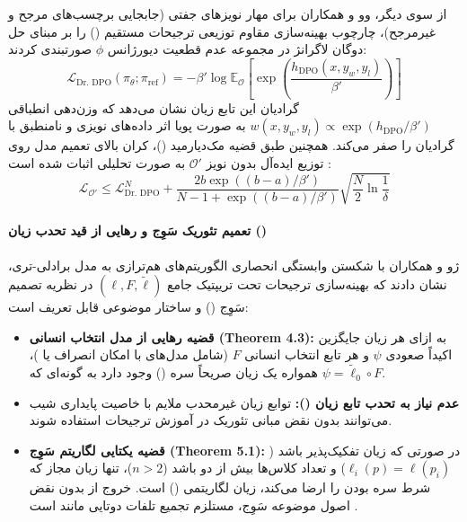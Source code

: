 از سوی دیگر، وو و همکاران \cite{wu2025drdpo} برای مهار نویزهای جفتی (جابجایی برچسب‌های مرجح و غیرمرجح)، چارچوب بهینه‌سازی مقاوم توزیعی ترجیحات مستقیم () را بر مبنای حل دوگان لاگرانژ در مجموعه عدم قطعیت دیورژانس $\phi$ صورتبندی کردند:
\begin{equation}
    \mathcal{L}_{\text{Dr. DPO}}(\pi_\theta; \pi_{\text{ref}}) = -\beta' \log \mathbb{E}_{\mathcal{O}} \left[ \exp\left( \frac{h_{\text{DPO}}(x, y_w, y_l)}{\beta'} \right) \right]
\end{equation}
گرادیان این تابع زیان نشان می‌دهد که وزن‌دهی انطباقی $w(x, y_w, y_l) \propto \exp(h_{\text{DPO}} / \beta')$ به صورت پویا اثر داده‌های نویزی و نامنطبق با گرادیان را صفر می‌کند. همچنین طبق قضیه مک‌دیارمید ()، کران بالای تعمیم مدل روی توزیع ایده‌آل بدون نویز $\mathcal{O}'$ به صورت تحلیلی اثبات شده است \cite{wu2025drdpo}:
\begin{equation}
    \mathcal{L}_{\mathcal{O}'} \le \mathcal{L}_{\text{Dr. DPO}}^N + \frac{2b \exp((b-a)/\beta')}{N - 1 + \exp((b-a)/\beta')} \sqrt{\frac{N}{2} \ln \frac{1}{\delta}}
\end{equation}

\paragraph*{تعمیم تئوریک سَوِج و رهایی از قید تحدب زیان ()}
ژو و همکاران \cite{zhou2026dpo} با شکستن وابستگی انحصاری الگوریتم‌های هم‌ترازی به مدل برادلی-تری، نشان دادند که بهینه‌سازی ترجیحات تحت تریپتیک جامع $(\ell, F, \tilde{\ell})$ در نظریه تصمیم سَوِج () و ساختار موضوعی  قابل تعریف است:
\begin{itemize}
    \item \textbf{قضیه رهایی از مدل انتخاب انسانی (Theorem 4.3):} به ازای هر زیان جایگزین اکیداً صعودی $\psi$ و هر تابع انتخاب انسانی $F$ (شامل مدل‌های با امکان انصراف یا )، همواره یک زیان صریحاً سره () وجود دارد به گونه‌ای که $\psi = \tilde{\ell}_0 \circ F$.
    \item \textbf{عدم نیاز به تحدب تابع زیان ():} توابع زیان غیرمحدب ملایم با خاصیت پایداری شیب می‌توانند بدون نقض مبانی تئوریک در آموزش ترجیحات استفاده شوند.
    \item \textbf{قضیه یکتایی لگاریتم سَوِج (Theorem 5.1):} در صورتی که زیان تفکیک‌پذیر باشد ($\ell_i(p) = \ell(p_i)$) و تعداد کلاس‌ها بیش از دو باشد ($n > 2$)، تنها زیان مجاز که شرط سره بودن را ارضا می‌کند، زیان لگاریتمی () است. خروج از  بدون نقض اصول موضوعه سَوِج، مستلزم تجمیع تلفات دوتایی مانند  است \cite{zhou2026dpo}.
\end{itemize}

